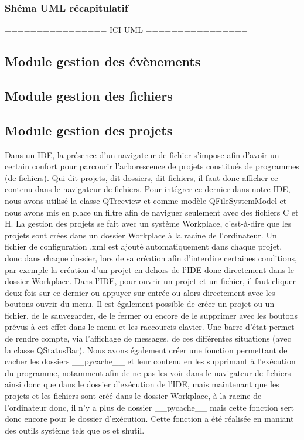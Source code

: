\documentclass[a4paper,12pt]{article}
\begin{document}
			
			\subsubsection*{Shéma UML récapitulatif}
					
					================ ICI UML ================
		
		\subsection{Module gestion des évènements}
		
		\subsection{Module gestion des fichiers}
		
		\subsection{Module gestion des projets}
		
		Dans un IDE, la présence d’un navigateur de fichier s’impose afin d’avoir un certain confort pour parcourir l’arborescence de projets constitués de programmes (de fichiers). Qui dit projets, dit dossiers, dit fichiers, il faut donc afficher ce contenu dans le navigateur de fichiers. Pour intégrer ce dernier dans notre IDE, nous avons utilisé la classe QTreeview et comme modèle QFileSystemModel et nous avons mis en place un filtre afin de naviguer seulement avec des fichiers C et H. La gestion des projets se fait avec un système Workplace, c’est-à-dire que les projets sont crées dans un dossier Workplace à la racine de l’ordinateur. Un fichier de configuration .xml est ajouté automatiquement dans chaque projet, donc dans chaque dossier, lors de sa création afin d’interdire certaines conditions, par exemple la création d’un projet en dehors de l’IDE donc directement dans le dossier Workplace. Dans l’IDE, pour ouvrir un projet et un fichier, il faut cliquer deux fois sur ce dernier ou appuyer sur entrée ou alors directement avec les boutons ouvrir du menu. Il est également possible de créer un projet ou un fichier, de le sauvegarder, de le fermer ou encore de le supprimer avec les boutons prévus à cet effet dans le menu et les raccourcis clavier. 
Une barre d’état permet de rendre compte, via l’affichage de messages, de ces différentes situations (avec la classe QStatusBar). 
Nous avons également créer une fonction permettant de cacher les dossiers \_\_pycache\_\_ et leur contenu en les supprimant à l'exécution du programme, notamment afin de ne pas les voir dans le navigateur de fichiers ainsi donc que dans le dossier d’exécution de l’IDE, mais maintenant que les projets et les fichiers sont créé dans le dossier Workplace, à la racine de l’ordinateur donc, il n’y a plus de dossier \_\_pycache\_\_ mais cette fonction sert donc encore pour le dossier d’exécution. Cette fonction a été réalisée en maniant des outils système tels que os et shutil.
\end{document}
